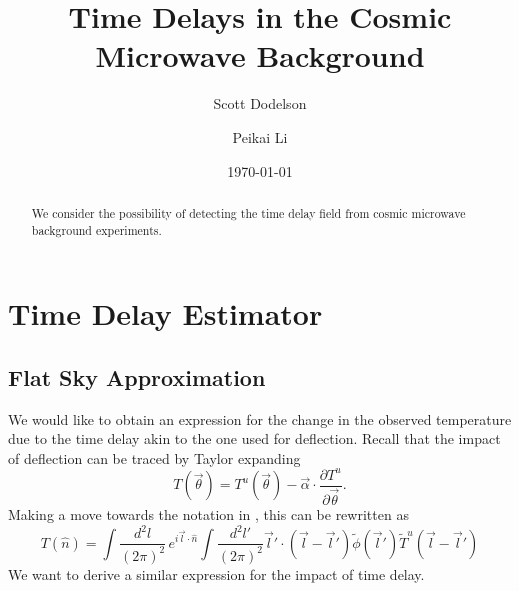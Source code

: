 \documentclass[prd,amsmath,amssymb,floatfix,superscriptaddress,nofootinbib,preprintnumbers]{revtex4-1}
\begin{document}
\title{\Large Time Delays in the Cosmic Microwave Background}


\author{\large Scott Dodelson}
\author{\large Peikai Li}

\date{\today}

\begin{abstract}
We consider the possibility of detecting the time delay field from cosmic microwave background experiments.
\end{abstract}

\maketitle

\section{Time Delay Estimator}

\subsection{Flat Sky Approximation} We would like to obtain an expression for the change in the observed temperature due to the time delay akin to the one used for deflection. Recall that the impact of deflection can be traced by Taylor expanding
\begin{equation}
T(\vec\theta) = T^u(\vec\theta) - \vec\alpha\cdot \frac{\partial T^u}{\partial\vec\theta}.
\end{equation}
Making a move towards the notation in \cite{Hu:2001yq}, this can be rewritten as
\begin{equation}
T(\hat n) = \int \frac{d^2l}{(2\pi)^2}\, e^{i\vec l\cdot\hat n} \int \frac{d^2l'}{(2\pi)^2} \vec l'\cdot (\vec l-\vec l') \tilde\phi(\vec l') \tilde T^u(\vec l-\vec l')
\end{equation}
We want to derive a similar expression for the impact of time delay. 
\end{document}
